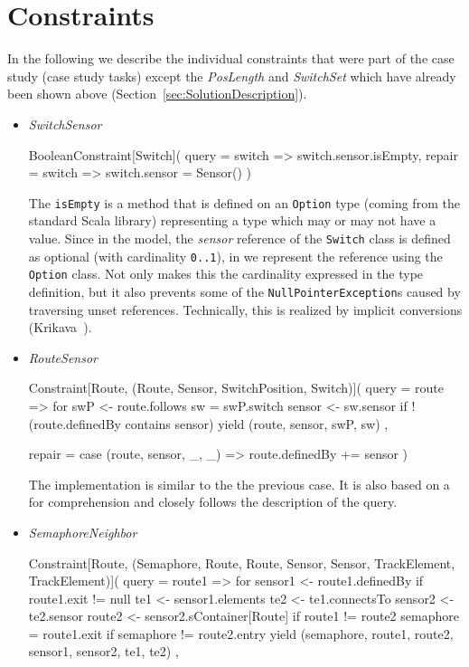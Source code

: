 
\section{Constraints}
\label{sec:Constraints}

In the following we describe the individual constraints that were part of the case study (case study tasks) except the \emph{PosLength} and \emph{SwitchSet} which have already been shown above (\Cf Section~\ref{sec:SolutionDescription}).

\begin{itemize}[---]
  \item \emph{SwitchSensor}
  \begin{scalacode}
  BooleanConstraint[Switch](
    query = switch => switch.sensor.isEmpty,
    repair = switch => switch.sensor = Sensor()
  )
  \end{scalacode}
  The \texttt{isEmpty} is a method that is defined on an \texttt{Option} type (coming from the standard Scala library) representing a type which may or may not have a value.
  Since in the model, the \emph{sensor} reference of the \texttt{Switch} class is defined as optional (with cardinality \texttt{0..1}), in \SIGMA we represent the reference using the \texttt{Option} class.
  Not only makes this the cardinality expressed in the type definition, but it also prevents some of the \texttt{NullPointerException}s caused by traversing unset references.
  Technically, this is realized by implicit conversions (\Cf Krikava~\Etal \cite{Krikava2014}).

  \item \emph{RouteSensor}
  \begin{scalacode}
  Constraint[Route, (Route, Sensor, SwitchPosition, Switch)](
    query = route => {
      for {
        swP <- route.follows
        sw = swP.switch
        sensor <- sw.sensor if !(route.definedBy contains sensor)
      } yield (route, sensor, swP, sw)
    },

    repair = {
      case (route, sensor, _, _) => route.definedBy += sensor
    }
  )
  \end{scalacode}
  The implementation is similar to the the previous case.
  It is also based on a for comprehension and closely follows the description of the query.
  
  \item \emph{SemaphoreNeighbor}
  \begin{scalacode}
  Constraint[Route, (Semaphore, Route, Route, Sensor, Sensor, TrackElement, TrackElement)](
    query = route1 => {
      for {
        sensor1 <- route1.definedBy if route1.exit != null
        te1 <- sensor1.elements
        te2 <- te1.connectsTo
        sensor2 <- te2.sensor
        route2 <- sensor2.sContainer[Route] if route1 != route2
        semaphore = route1.exit if semaphore != route2.entry
      } yield (semaphore, route1, route2, sensor1, sensor2, te1, te2)
    },


\end{scalacode}
\end{itemize}
